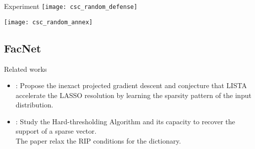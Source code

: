 \documentclass{beamer}
\newcommand{\btitle}[1]{{\usebeamerfont{block title}\usebeamercolor[fg]{block title} #1}}
\begin{document}
\begin{frame}{Experiment}
		\centering
		\texttt{[image: csc\_random\_defense]}

\end{frame}


\begin{frame}
	\centering
	\texttt{[image: csc\_random\_annex]}	
\end{frame}

\subsection{FacNet}


\begin{frame}{Related works}

\begin{itemize}\itemsep2em
	\item \cite{Giryes2016}: Propose the inexact projected gradient descent and conjecture that LISTA accelerate the LASSO resolution by learning the sparsity pattern of the input distribution.
	\item \cite{xin2016maximal}: Study the Hard-thresholding Algorithm and its
	capacity to recover the support of a sparse vector.\\
	The paper relax the RIP conditions for the dictionary.
\end{itemize}
\end{frame}
\end{document}
